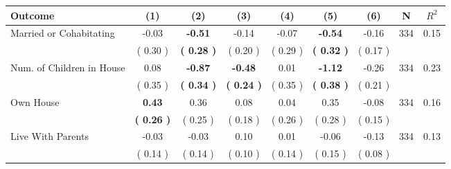 \begin{tabular}{lcccccccc}
\toprule
 \textbf{Outcome} & \textbf{(1)} & \textbf{(2)} & \textbf{(3)} & \textbf{(4)} & \textbf{(5)} & \textbf{(6)} & \textbf{N} & \textbf{$ R^2$} \\
\midrule
Married or Cohabitating &     -0.03 & \textbf{    -0.51} &     -0.14 &     -0.07 & \textbf{    -0.54} &     -0.16 & 334 &       0.15 \\ 
 & (     0.30 ) & \textbf{(     0.28 )} & (     0.20 ) & (     0.29 ) & \textbf{(     0.32 )} & (     0.17 ) & \\
Num. of Children in House &      0.08 & \textbf{    -0.87} & \textbf{    -0.48} &      0.01 & \textbf{    -1.12} &     -0.26 & 334 &       0.23 \\ 
 & (     0.35 ) & \textbf{(     0.34 )} & \textbf{(     0.24 )} & (     0.35 ) & \textbf{(     0.38 )} & (     0.21 ) & \\
Own House & \textbf{     0.43} &      0.36 &      0.08 &      0.04 &      0.35 &     -0.08 & 334 &       0.16 \\ 
 & \textbf{(     0.26 )} & (     0.25 ) & (     0.18 ) & (     0.26 ) & (     0.28 ) & (     0.15 ) & \\
Live With Parents &     -0.03 &     -0.03 &      0.10 &      0.01 &     -0.06 &     -0.13 & 334 &       0.13 \\ 
 & (     0.14 ) & (     0.14 ) & (     0.10 ) & (     0.14 ) & (     0.15 ) & (     0.08 ) & \\
\bottomrule
\end{tabular}
